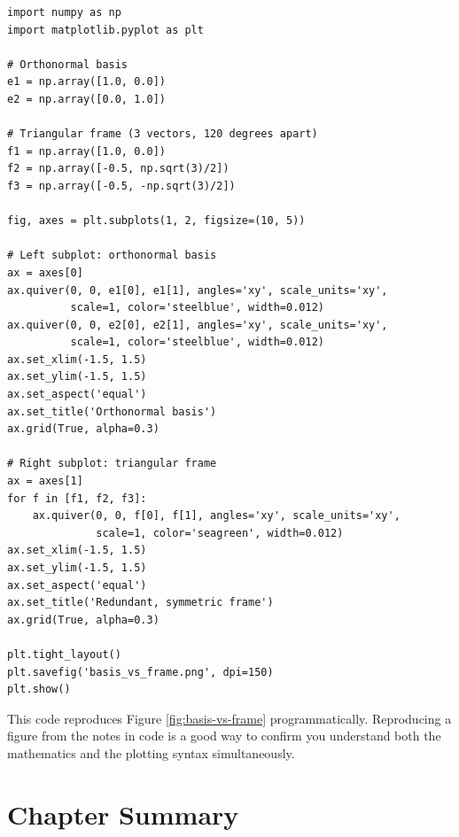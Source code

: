 \begin{lstlisting}[caption={Plotting the basis and the triangular frame from Figure 1.1}]
import numpy as np
import matplotlib.pyplot as plt

# Orthonormal basis
e1 = np.array([1.0, 0.0])
e2 = np.array([0.0, 1.0])

# Triangular frame (3 vectors, 120 degrees apart)
f1 = np.array([1.0, 0.0])
f2 = np.array([-0.5, np.sqrt(3)/2])
f3 = np.array([-0.5, -np.sqrt(3)/2])

fig, axes = plt.subplots(1, 2, figsize=(10, 5))

# Left subplot: orthonormal basis
ax = axes[0]
ax.quiver(0, 0, e1[0], e1[1], angles='xy', scale_units='xy',
          scale=1, color='steelblue', width=0.012)
ax.quiver(0, 0, e2[0], e2[1], angles='xy', scale_units='xy',
          scale=1, color='steelblue', width=0.012)
ax.set_xlim(-1.5, 1.5)
ax.set_ylim(-1.5, 1.5)
ax.set_aspect('equal')
ax.set_title('Orthonormal basis')
ax.grid(True, alpha=0.3)

# Right subplot: triangular frame
ax = axes[1]
for f in [f1, f2, f3]:
    ax.quiver(0, 0, f[0], f[1], angles='xy', scale_units='xy',
              scale=1, color='seagreen', width=0.012)
ax.set_xlim(-1.5, 1.5)
ax.set_ylim(-1.5, 1.5)
ax.set_aspect('equal')
ax.set_title('Redundant, symmetric frame')
ax.grid(True, alpha=0.3)

plt.tight_layout()
plt.savefig('basis_vs_frame.png', dpi=150)
plt.show()
\end{lstlisting}

This code reproduces Figure \ref{fig:basis-vs-frame} programmatically. Reproducing a figure from the notes in code is a good way to confirm you understand both the mathematics and the plotting syntax simultaneously.

\section{Chapter Summary}
\label{sec:summary}

